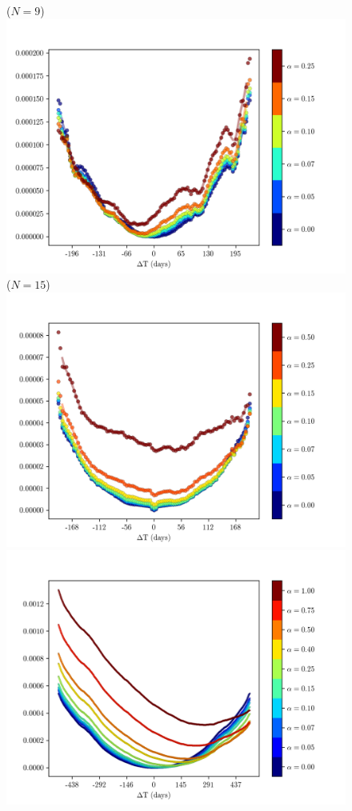 \documentclass{article}
\theoremstyle{definition}
\begin{document}
	\begin{figure}
		\centering
		\vspace{-3em}
		($N=9$)\includegraphics[height=0.32\textheight]{figs/dt_vs_err/better_at_past_G4D_9.png}\\
		($N=15$)\includegraphics[height=0.32\textheight]{figs/dt_vs_err/balanced_G4D_15.png}\\
		\includegraphics[height=0.32\textheight]{figs/dt_vs_err/G2D_30.png}~

\end{figure}
\end{document}
